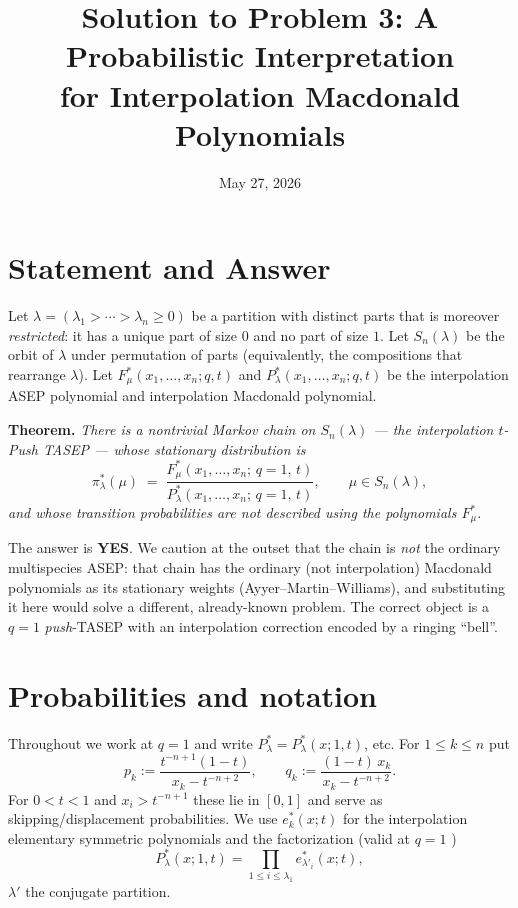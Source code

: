 \documentclass[11pt]{article}
\title{Solution to Problem 3: A Probabilistic Interpretation\\
for Interpolation Macdonald Polynomials}
\author{}
\date{May 27, 2026}
\newcommand{\Snl}{S_n(\lambda)}
\theoremstyle{definition}
\begin{document}
\maketitle

\section*{Statement and Answer}

Let $\lambda=(\lambda_1>\cdots>\lambda_n\ge0)$ be a partition with distinct
parts that is moreover \emph{restricted}: it has a unique part of size $0$ and no
part of size $1$. Let $\Snl$ be the orbit of $\lambda$ under permutation of
parts (equivalently, the compositions that rearrange $\lambda$). Let
$F^*_\mu(x_1,\dots,x_n;q,t)$ and $P^*_\lambda(x_1,\dots,x_n;q,t)$ be the
interpolation ASEP polynomial and interpolation Macdonald polynomial.

\medskip
\noindent\textbf{Theorem.} \emph{There is a nontrivial Markov chain on $\Snl$ ---
the \emph{interpolation $t$-Push TASEP} --- whose stationary distribution is}
\[
\pi^*_\lambda(\mu)\;=\;\frac{F^*_\mu(x_1,\dots,x_n;\,q=1,\,t)}{P^*_\lambda(x_1,\dots,x_n;\,q=1,\,t)},
\qquad \mu\in\Snl,
\]
\emph{and whose transition probabilities are not described using the
polynomials $F^*_\mu$.}

\medskip
\noindent The answer is \textbf{YES}. We caution at the outset that the chain is
\emph{not} the ordinary multispecies ASEP: that chain has the ordinary (not
interpolation) Macdonald polynomials as its stationary weights (Ayyer--Martin--Williams),
and substituting it here would solve a different, already-known problem. The
correct object is a $q=1$ \emph{push}-TASEP with an interpolation correction
encoded by a ringing ``bell''.

\section*{Probabilities and notation}

Throughout we work at $q=1$ and write $P^*_\lambda=P^*_\lambda(x;1,t)$, etc.
For $1\le k\le n$ put
\[
p_k:=\frac{t^{-n+1}(1-t)}{x_k-t^{-n+2}},\qquad
q_k:=\frac{(1-t)\,x_k}{x_k-t^{-n+2}} .
\]
For $0<t<1$ and $x_i>t^{-n+1}$ these lie in $[0,1]$ and serve as
skipping/displacement probabilities. We use $e^*_k(x;t)$ for the interpolation
elementary symmetric polynomials and the factorization (valid at $q=1$
\cite{Dolega,BDW25a})
\begin{equation}\label{eq:factor}
P^*_\lambda(x;1,t)=\prod_{1\le i\le\lambda_1}e^*_{\lambda'_i}(x;t),
\end{equation}
$\lambda'$ the conjugate partition.
\end{document}
